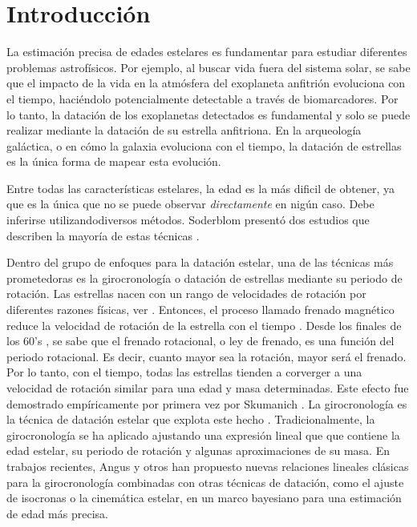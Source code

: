 
\chapter{Introducción} 
\label{sec:intro}
 
La estimación precisa de edades estelares es fundamentar para estudiar diferentes problemas astrofísicos. Por ejemplo, al buscar vida fuera del sistema solar, se sabe que el impacto de la vida en la atmósfera del exoplaneta anfitrión evoluciona con el tiempo, haciéndolo potencialmente detectable a través de biomarcadores. Por lo tanto, la datación de los exoplanetas detectados es fundamental y solo se puede realizar mediante la datación de su estrella anfitriona. En la arqueología galáctica, o en cómo la galaxia evoluciona con el tiempo, la datación de estrellas es la única forma de mapear esta evolución.

Entre todas las características estelares, la edad es la más dificil de obtener, ya que es la única que no se puede observar \emph{directamente} en nigún caso. Debe inferirse utilizandodiversos métodos. Soderblom presentó dos estudios que describen la mayoría de estas técnicas \cite{Soderblom15,Soderblom10}.

Dentro del grupo de enfoques para la datación estelar, una de las técnicas más prometedoras es la girocronología o datación de estrellas mediante su periodo de rotación. Las estrellas nacen con un rango de velocidades de rotación por diferentes razones físicas, ver \cite{Barnes03}. Entonces, el proceso llamado frenado magnético reduce la velocidad de rotación de la estrella con el tiempo \cite{Schatzman62}. Desde los finales de los 60's \cite{Belcher76,Kawaler88,Mestel68,Mestel87,Weber67}, se sabe que el frenado rotacional, o ley de frenado, es una función del periodo rotacional.
Es decir, cuanto mayor sea la rotación, mayor será el frenado. Por lo tanto, con el tiempo, todas las estrellas tienden a corverger a una velocidad de rotación similar para una edad y masa determinadas. Este efecto fue demostrado empíricamente por primera vez por Skumanich \cite{Skumanich72}. La girocronología es la técnica de datación estelar que explota este hecho \cite{Barnes16,Soderblom15}. Tradicionalmente, la girocronología se ha aplicado ajustando una expresión lineal que que contiene la edad estelar, su periodo de rotación y algunas aproximaciones de su masa. En trabajos recientes, Angus y otros \cite{Angus20,Angus19} han propuesto nuevas relaciones lineales clásicas para la girocronología combinadas con otras técnicas de datación, como el ajuste de isocronas o la cinemática estelar, en un marco bayesiano para una estimación de edad más precisa.


